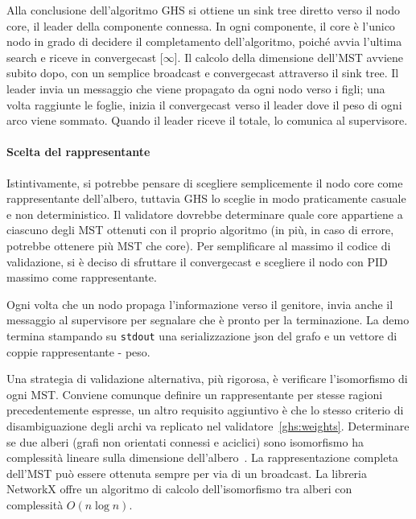 \documentclass[target=bach,aauheader=,style=]{thud}
\newcommand{\eng}[1]{\foreignlanguage{english}{#1}}
\begin{document}
Alla conclusione dell'algoritmo GHS si ottiene un \eng{sink tree} diretto verso il nodo core, il leader della componente connessa. In ogni componente, il core è l'unico nodo in grado di decidere il completamento dell'algoritmo, poiché avvia l'ultima \eng{search} e riceve in \eng{convergecast} [$\infty$]. Il calcolo della dimensione dell'MST avviene subito dopo, con un semplice \eng{broadcast} e \eng{convergecast} attraverso il \eng{sink tree}. Il leader invia un messaggio  che viene propagato da ogni nodo verso i figli; una volta raggiunte le foglie, inizia il \eng{convergecast} verso il leader dove il peso di ogni arco viene sommato. Quando il leader riceve il totale, lo comunica al supervisore.

\paragraph{Scelta del rappresentante}
Istintivamente, si potrebbe pensare di scegliere semplicemente il nodo core come rappresentante dell'albero, tuttavia GHS lo sceglie in modo praticamente casuale e non deterministico. Il validatore dovrebbe determinare quale core appartiene a ciascuno degli MST ottenuti con il proprio algoritmo (in più, in caso di errore, potrebbe ottenere più MST che core). Per semplificare al massimo il codice di validazione, si è deciso di sfruttare il \eng{convergecast} e scegliere il nodo con PID massimo come rappresentante.
\bigskip

Ogni volta che un nodo propaga l'informazione verso il genitore, invia anche il messaggio  al supervisore per segnalare che è pronto per la terminazione. La demo termina stampando su \lstinline{stdout} una serializzazione json del grafo e un vettore di coppie rappresentante - peso.
\bigskip

Una strategia di validazione alternativa, più rigorosa, è verificare l'isomorfismo di ogni MST. Conviene comunque definire un rappresentante per stesse ragioni precedentemente espresse, un altro requisito aggiuntivo è che lo stesso criterio di disambiguazione degli archi va replicato nel validatore~\ref{ghs:weights}. Determinare se due alberi (grafi non orientati connessi e aciclici) sono isomorfismo ha complessità lineare sulla dimensione dell'albero~\cite{10.5555/578775}. La rappresentazione completa dell'MST può essere ottenuta sempre per via di un \eng{broadcast}. La libreria NetworkX offre un algoritmo di calcolo dell'isomorfismo tra alberi con complessità $O(n\log n)$.
\end{document}
